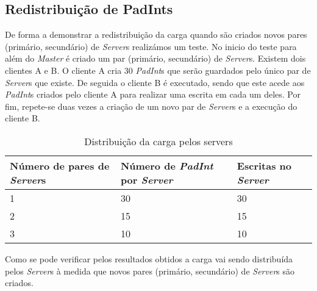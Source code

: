 \subsection{Redistribuição de PadInts}

De forma a demonstrar a redistribuição da carga quando são criados novos pares (primário, secundário) de \textit{Server}s realizámos um teste. No inicio do teste para além do \textit{Master} é criado um par (primário, secundário) de \textit{Server}s. Existem dois clientes A e B. O cliente A cria 30 \textit{PadInt}s que serão guardados pelo único par de \textit{Server}s que existe. De seguida o cliente B é executado, sendo que este acede aos \textit{PadInt}s criados pelo cliente A para realizar uma escrita em cada um deles. Por fim, repete-se duas vezes a criação de um novo par de \textit{Server}s e a execução do cliente B.
\begin{table}[H]
\centering
\begin{tabular}{| p{2.2cm} | p{2.2cm} | p{2.2cm} |}
\hline
\textbf{Número de pares de \textit{Server}s} &\textbf{Número de \textit{PadInt} por \textit{Server}} & \textbf{Escritas no \textit{Server}} \\
\hline
1 & 30 & 30  \\
\hline
2 & 15 & 15  \\
\hline
3 & 10 & 10 \\
\hline
\end{tabular}
\caption{Distribuição da carga pelos servers} \label{figRedistribuicao}
\end{table}

Como se pode verificar pelos resultados obtidos a carga vai sendo distribuída pelos \textit{Server}s à medida que novos pares (primário, secundário) de \textit{Server}s são criados.
